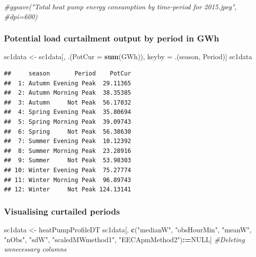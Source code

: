 \documentclass[]{article}
\newenvironment{Shaded}{\begin{snugshade}}{\end{snugshade}}
\newcommand{\KeywordTok}[1]{\textcolor[rgb]{0.13,0.29,0.53}{\textbf{#1}}}
\newcommand{\DataTypeTok}[1]{\textcolor[rgb]{0.13,0.29,0.53}{#1}}
\newcommand{\StringTok}[1]{\textcolor[rgb]{0.31,0.60,0.02}{#1}}
\newcommand{\CommentTok}[1]{\textcolor[rgb]{0.56,0.35,0.01}{\textit{#1}}}
\newcommand{\OtherTok}[1]{\textcolor[rgb]{0.56,0.35,0.01}{#1}}
\newcommand{\OperatorTok}[1]{\textcolor[rgb]{0.81,0.36,0.00}{\textbf{#1}}}
\newcommand{\ErrorTok}[1]{\textcolor[rgb]{0.64,0.00,0.00}{\textbf{#1}}}
\newcommand{\NormalTok}[1]{#1}
\theoremstyle{definition}
\theoremstyle{definition}
\theoremstyle{definition}
\theoremstyle{remark}
\begin{document}
\begin{Shaded}
\begin{Highlighting}[]
\CommentTok{#ggsave("Total heat pump energy consumption by time-period for 2015.jpeg",}
       \CommentTok{#dpi=600)}
\end{Highlighting}
\end{Shaded}

\subsubsection{Potential load curtailment output by period in
GWh}\label{potential-load-curtailment-output-by-period-in-gwh}

\begin{Shaded}
\begin{Highlighting}[]
\NormalTok{sc1data <-}\StringTok{ }\NormalTok{sc1data[, .(}\DataTypeTok{PotCur =} \KeywordTok{sum}\NormalTok{(GWh)),}
\NormalTok{                   keyby =}\StringTok{ }\NormalTok{.(season, Period)]}
\NormalTok{sc1data}
\end{Highlighting}
\end{Shaded}

\begin{verbatim}
##     season       Period    PotCur
##  1: Autumn Evening Peak  29.11365
##  2: Autumn Morning Peak  38.35385
##  3: Autumn     Not Peak  56.17032
##  4: Spring Evening Peak  35.80694
##  5: Spring Morning Peak  39.09743
##  6: Spring     Not Peak  56.38630
##  7: Summer Evening Peak  10.12392
##  8: Summer Morning Peak  23.28916
##  9: Summer     Not Peak  53.98303
## 10: Winter Evening Peak  75.27774
## 11: Winter Morning Peak  96.89743
## 12: Winter     Not Peak 124.13141
\end{verbatim}

\subsubsection{Visualising curtailed
periods}\label{visualising-curtailed-periods}

\begin{Shaded}
\begin{Highlighting}[]
\NormalTok{sc1data <-}\StringTok{ }\NormalTok{heatPumpProfileDT}
\NormalTok{sc1data[, }\KeywordTok{c}\NormalTok{(}\StringTok{"medianW"}\NormalTok{, }\StringTok{"obsHourMin"}\NormalTok{, }\StringTok{"meanW"}\NormalTok{, }\StringTok{"nObs"}\NormalTok{, }\StringTok{"sdW"}\NormalTok{,}
            \StringTok{"scaledMWmethod1"}\NormalTok{, }\StringTok{"EECApmMethod2"}\NormalTok{)}\OperatorTok{:}\ErrorTok{=}\OtherTok{NULL}\NormalTok{] }\CommentTok{#Deleting unnecessary columns}
\end{Highlighting}
\end{Shaded}
\end{document}
